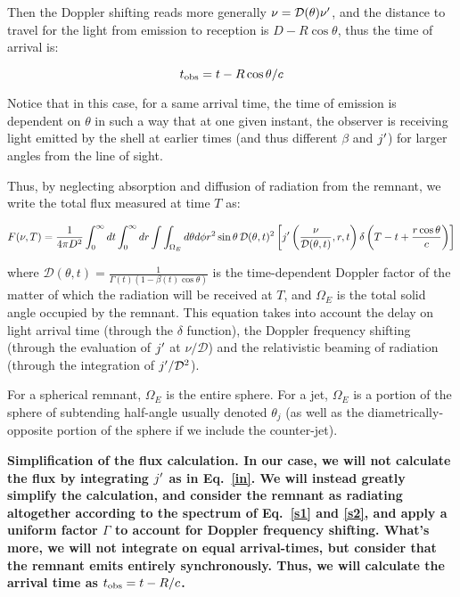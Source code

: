 Then the Doppler shifting reads more generally $\nu = \mathcal{D}(\theta)\nu^{\prime}$, and the distance to travel for the light from emission to reception is $D - R \cos \theta$, thus the time of arrival is:

\begin{equation}
t_{\mathrm{obs}} = t - R \cos \theta / c
\end{equation}

Notice that in this case, for a same arrival time, the time of emission is dependent on $\theta$ in such a way that at one given instant, the observer is receiving light emitted by the shell at earlier times (and thus different $\beta$ and $j^{\prime}$) for larger angles from the line of sight.

Thus, by neglecting absorption and diffusion of radiation from the remnant, we write the total flux measured at time $T$ as:


\begin{equation}\label{in}
    F(\nu, T) = \frac{1}{4\pi D ^ 2}\int_0^{\infty} dt \int_0^\infty dr \int \int_{\Omega_E} d\theta d\phi r^2 \sin \theta \,\mathcal{D}(\theta, t)^2 \left[ j^{\prime}\left(\frac{\nu}{\mathcal{D}(\theta, t)}, r, t\right) \delta\left(T - t + \frac{r\cos\theta}{c}\right) \right]
\end{equation}


where $\mathcal{D}(\theta, t) = \frac{1}{\Gamma(t)(1 - \beta(t) \cos \theta)}$ is the time-dependent Doppler factor of the matter of which the radiation will be received at $T$, and $\Omega_E$ is the total solid angle occupied by the remnant. This equation takes into account the delay on light arrival time (through the $\delta$ function), the Doppler frequency shifting (through the evaluation of $j^{\prime}$ at $\nu/\mathcal{D}$) and the relativistic beaming of radiation (through the integration of $j^{\prime}/\mathcal{D}^2$).

For a spherical remnant, $\Omega_E$ is the entire sphere. For a jet, $\Omega_E$ is a portion of the sphere of subtending half-angle usually denoted $\theta_j$ (as well as the diametrically-opposite portion of the sphere if we include the counter-jet).


\bf{Simplification of the flux calculation.} In our case, we will not calculate the flux by integrating $j^{\prime}$ as in Eq.~\ref{in}. We will instead greatly simplify the calculation, and consider the remnant as radiating altogether according to the spectrum of Eq.~\ref{s1} and \ref{s2}, and apply a uniform factor $\Gamma$ to account for Doppler frequency shifting. What's more, we will not integrate on equal arrival-times, but consider that the remnant emits entirely synchronously. Thus, we will calculate the arrival time as $t_{\mathrm{obs}} = t - R/c$.

